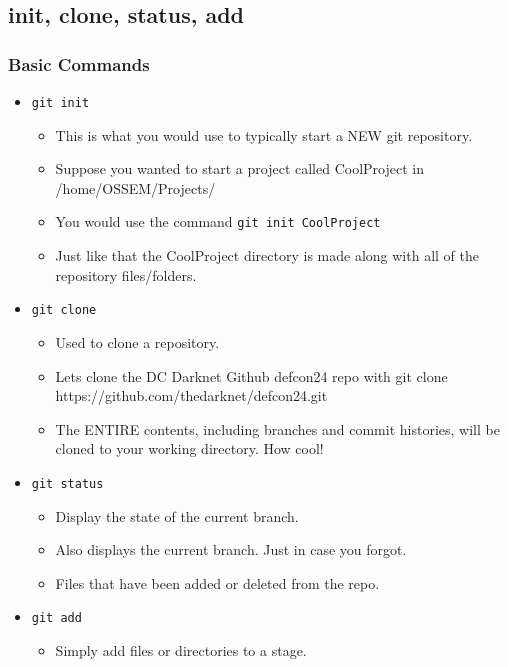 \documentclass{beamer}
\begin{document}
\subsection{init, clone, status, add}
\begin{frame}
    \frametitle{Basic Commands}
    \begin{itemize}

        \item{\texttt{git init}}
        \begin{itemize}
            \item{This is what you would use to typically start a NEW git repository.}
            \item{Suppose you wanted to start a project called CoolProject in /home/OSSEM/Projects/}
            \item{You would use the command \texttt{git init CoolProject}}
            \item{Just like that the CoolProject directory is made along with all of the repository files/folders.}
        \end{itemize}

    \item{\texttt{git clone}}
        \begin{itemize}
            \item{Used to clone a repository.}
            \item{Lets clone the DC Darknet Github defcon24 repo with git clone https://github.com/thedarknet/defcon24.git}
            \item{The ENTIRE contents, including branches and commit histories, will be cloned to your working directory. How cool!}
        \end{itemize}
        
    \item{\texttt{git status}}
        \begin{itemize}
            \item{Display the state of the current branch.}
            \item{Also displays the current branch. Just in case you forgot.}
            \item{Files that have been added or deleted from the repo.}
        \end{itemize}

    \item{\texttt{git add}}
        \begin{itemize}
            \item{Simply add files or directories to a stage.}
        \end{itemize}

    \end{itemize}
\end{frame}
\end{document}
